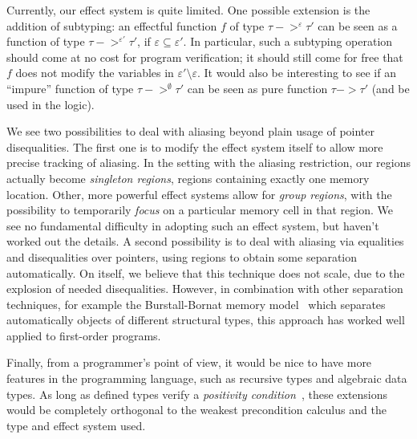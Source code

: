 \documentclass[a4paper]{llncs}
\begin{document}
Currently, our effect system is quite limited. One possible extension is the
addition of subtyping: an effectful function $f$ of type $τ ->^ετ'$ can be seen
as a function of type $τ ->^{ε'}τ'$, if $ε\subseteq ε'$. In particular, such a
subtyping operation should come at no cost for program verification; it should
still come for free that $f$ does not modify the variables in $ε'\setminus ε$. It
would also be interesting to see if an ``impure'' function of type $τ
->^\emptyset τ'$ can be seen as pure function $τ -> τ'$ (and be used in the
logic).

We see two possibilities to deal with aliasing beyond plain usage of pointer
disequalities. The first one is to modify the effect system itself to allow
more precise tracking of aliasing. In the setting with the aliasing
restriction, our regions actually become {\em singleton regions}, regions
containing exactly one memory location. Other, more powerful effect systems
allow for {\em group regions}, with the possibility to temporarily {\em focus
} on a particular memory cell in that region. We see no fundamental difficulty
in adopting such an effect system, but haven't worked out the details. A
second possibility is to deal with aliasing via equalities and disequalities
over pointers, using regions to obtain some separation automatically. On
itself, we believe that this technique does not scale, due to the explosion of
needed disequalities.  However, in combination with other separation
techniques, for example the Burstall-Bornat memory model~\cite{bornat00mpc}
which separates automatically objects of different structural types, this
approach has worked well applied to first-order programs.

Finally, from a programmer's point of view, it would be nice to have more
features in the programming language, such as recursive types and algebraic
data types. As long as defined types verify a {\em positivity
condition}~\cite{paulintlca93}, these extensions would be completely
orthogonal to the weakest precondition calculus and the type and effect system
used.



{}
\end{document}
